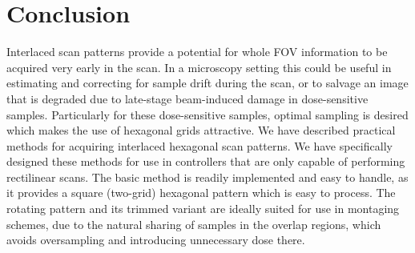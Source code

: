 \documentclass[aip, amsmath, amssymb, nobibnotes, nofootinbib, citeautoscript, reprint, superscriptaddress]{revtex4-2}
\begin{document}
    \section{\label{sec:conclusion}Conclusion}

    Interlaced scan patterns provide a potential for whole FOV information to be acquired very early in the scan.
    In a microscopy setting this could be useful in estimating and correcting for sample drift during the scan, or to salvage an image that is degraded due to late-stage beam-induced damage in dose-sensitive samples.
    Particularly for these dose-sensitive samples, optimal sampling is desired which makes the use of hexagonal grids attractive.
    We have described practical methods for acquiring interlaced hexagonal scan patterns.
    We have specifically designed these methods for use in controllers that are only
    capable of performing rectilinear scans.
    The basic method is readily implemented and easy to handle, as it provides a square (two-grid) hexagonal pattern which is easy to process.
    The rotating pattern and its trimmed variant are ideally suited for use in montaging schemes, due to the natural sharing of samples in the overlap regions, which avoids oversampling and introducing unnecessary dose there.
\end{document}
